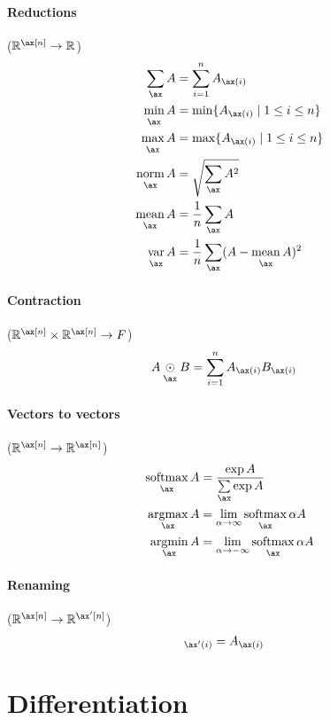 \documentclass{article}
\newcommand{\reals}{\mathbb{R}}
\begin{document}
\paragraph{Reductions} ($\reals^{\ax[n]} \rightarrow \reals$)
\begin{align*}
  \nsum{\ax} A &= \sum_{i=1}^n A_{\ax(i)} \\
  \nfun{\ax}{min} A &= \min \{A_{\ax(i)} \mid 1 \leq i \leq n\} \\
  \nfun{\ax}{max} A &= \max \{A_{\ax(i)} \mid 1 \leq i \leq n\} \\
  \nfun{\ax}{norm} A &= \sqrt{\nsum{\ax} A^2} \\
  \nfun{\ax}{mean} A &= \frac{1}{n} \nsum{\ax} A \\
  \nfun{\ax}{var} A &= \frac{1}{n} \nsum{\ax} (A - \nfun{\ax}{mean} A)^2
\end{align*}

\paragraph{Contraction} ($\reals^{\ax[n]} \times \reals^{\ax[n]} \rightarrow F$)
\begin{align*}
  A \ndot{\ax} B &= \sum_{i=1}^n A_{\ax(i)} B_{\ax(i)}
\end{align*}

\paragraph{Vectors to vectors} ($\reals^{\ax[n]} \rightarrow \reals^{\ax[n]}$)
\begin{align*}
  \nfun{\ax}{softmax} A &= \frac{\exp A}{\nsum{\ax} \exp A} \\
  \nfun{\ax}{argmax} A &= \lim_{\alpha \rightarrow \infty} \nfun{\ax}{softmax} \alpha A \\
  \nfun{\ax}{argmin} A &= \lim_{\alpha \rightarrow -\infty} \nfun{\ax}{softmax} \alpha A
\end{align*}

\paragraph{Renaming} ($\reals^{\ax[n]} \rightarrow \reals^{\ax'[n]}$)
\begin{align*}
  [A_{\ax\rightarrow\ax'}]_{\ax'(i)} &= A_{\ax(i)}
\end{align*}

\section{Differentiation}
\end{document}
